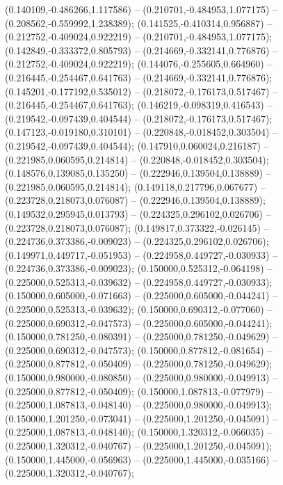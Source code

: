  (0.140109,-0.486266,1.117586) -- (0.210701,-0.484953,1.077175) -- (0.208562,-0.559992,1.238389);
 (0.141525,-0.410314,0.956887) -- (0.212752,-0.409024,0.922219) -- (0.210701,-0.484953,1.077175);
 (0.142849,-0.333372,0.805793) -- (0.214669,-0.332141,0.776876) -- (0.212752,-0.409024,0.922219);
 (0.144076,-0.255605,0.664960) -- (0.216445,-0.254467,0.641763) -- (0.214669,-0.332141,0.776876);
 (0.145201,-0.177192,0.535012) -- (0.218072,-0.176173,0.517467) -- (0.216445,-0.254467,0.641763);
 (0.146219,-0.098319,0.416543) -- (0.219542,-0.097439,0.404544) -- (0.218072,-0.176173,0.517467);
 (0.147123,-0.019180,0.310101) -- (0.220848,-0.018452,0.303504) -- (0.219542,-0.097439,0.404544);
 (0.147910,0.060024,0.216187) -- (0.221985,0.060595,0.214814) -- (0.220848,-0.018452,0.303504);
 (0.148576,0.139085,0.135250) -- (0.222946,0.139504,0.138889) -- (0.221985,0.060595,0.214814);
 (0.149118,0.217796,0.067677) -- (0.223728,0.218073,0.076087) -- (0.222946,0.139504,0.138889);
 (0.149532,0.295945,0.013793) -- (0.224325,0.296102,0.026706) -- (0.223728,0.218073,0.076087);
 (0.149817,0.373322,-0.026145) -- (0.224736,0.373386,-0.009023) -- (0.224325,0.296102,0.026706);
 (0.149971,0.449717,-0.051953) -- (0.224958,0.449727,-0.030933) -- (0.224736,0.373386,-0.009023);
 (0.150000,0.525312,-0.064198) -- (0.225000,0.525313,-0.039632) -- (0.224958,0.449727,-0.030933);
 (0.150000,0.605000,-0.071663) -- (0.225000,0.605000,-0.044241) -- (0.225000,0.525313,-0.039632);
 (0.150000,0.690312,-0.077060) -- (0.225000,0.690312,-0.047573) -- (0.225000,0.605000,-0.044241);
 (0.150000,0.781250,-0.080391) -- (0.225000,0.781250,-0.049629) -- (0.225000,0.690312,-0.047573);
 (0.150000,0.877812,-0.081654) -- (0.225000,0.877812,-0.050409) -- (0.225000,0.781250,-0.049629);
 (0.150000,0.980000,-0.080850) -- (0.225000,0.980000,-0.049913) -- (0.225000,0.877812,-0.050409);
 (0.150000,1.087813,-0.077979) -- (0.225000,1.087813,-0.048140) -- (0.225000,0.980000,-0.049913);
 (0.150000,1.201250,-0.073041) -- (0.225000,1.201250,-0.045091) -- (0.225000,1.087813,-0.048140);
 (0.150000,1.320312,-0.066035) -- (0.225000,1.320312,-0.040767) -- (0.225000,1.201250,-0.045091);
 (0.150000,1.445000,-0.056963) -- (0.225000,1.445000,-0.035166) -- (0.225000,1.320312,-0.040767);
